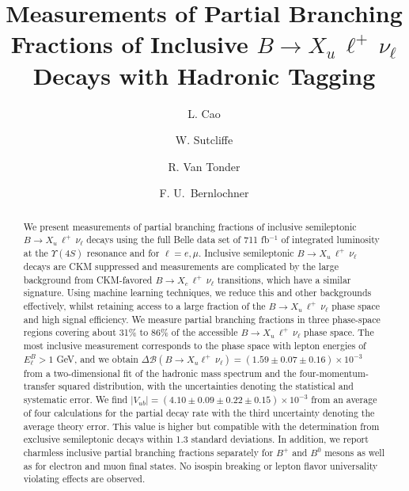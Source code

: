 \documentclass[twocolumn,aps,prd,superscriptaddress,nofootinbib,floatfix,preprintnumbers,a4]{revtex4-1}
\newcommand{\bfResd}{\ensuremath{\Delta \mathcal{B}(B \to X_u \ell^+ \, \nu_\ell) = \left( 1.59 \pm 0.07  \pm 0.16 \right) \times 10^{-3}}\xspace}
\newcommand{\bfResAverageVuba}{\ensuremath{\left| V_{ub} \right| = \left( 4.10 \pm 0.09  \pm 0.22 \pm 0.15  \right) \times 10^{-3}}\xspace}
\newcommand{\bulnu}{\ensuremath{B \to X_u \, \ell^+\, \nu_{\ell}}\xspace}
\newcommand{\bclnu}{\ensuremath{B \to X_c \, \ell^+\, \nu_{\ell}}\xspace}
\begin{document}


\title{Measurements of Partial Branching Fractions of Inclusive \bulnu Decays with Hadronic Tagging}

\author{L. Cao}

\author{W. Sutcliffe}

\author{R. Van Tonder}

\author{F. U.\ Bernlochner}




\begin{abstract}
We present measurements of partial branching fractions of inclusive semileptonic \bulnu decays using the full Belle data set of 711 fb$^{-1}$ of integrated luminosity at the $\Upsilon(4S)$ resonance and for $\ell = e, \mu$. Inclusive semileptonic  \bulnu decays are CKM suppressed and measurements are complicated by the large background from CKM-favored \bclnu transitions, which have a similar signature. Using machine learning techniques, we reduce this and other backgrounds effectively, whilst retaining access to a large fraction of the \bulnu phase space and high signal efficiency. We measure partial branching fractions in three phase-space regions covering about 31\% to 86\% of the accessible \bulnu phase space. The most inclusive measurement corresponds to the phase space with lepton energies of $E_\ell^B > 1 $ GeV, and we obtain \bfResd from a two-dimensional fit of the hadronic mass spectrum and the four-momentum-transfer squared distribution, with the uncertainties denoting the statistical and systematic error. We find \bfResAverageVuba from an average of four calculations for the partial decay rate with the third uncertainty denoting the average theory error. This value is higher but compatible with the determination from exclusive semileptonic decays within 1.3 standard deviations. In addition, we report charmless inclusive partial branching fractions separately for $B^+$ and $B^0$ mesons as well as for electron and muon final states. No isospin breaking or lepton flavor universality violating effects are observed.
\end{abstract}


\end{document}
